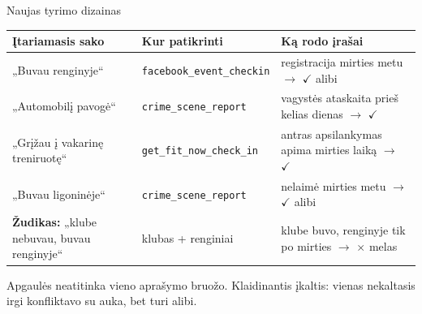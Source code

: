 \documentclass[hyperref={breaklinks=true},fleqn,mathserif]{beamer}
\newcommand{\yes}{\textcolor{green!50!black}{$\checkmark$}}
\newcommand{\no}{\textcolor{red!70!black}{$\times$}}
\begin{document}
\begin{frame}{Naujas tyrimo dizainas}

\begin{center}
\end{center}

\vspace{-2mm}
\scriptsize
\setlength{\tabcolsep}{3pt}
\begin{tabular}{@{}>{\raggedright\arraybackslash}p{}>{\raggedright\arraybackslash}p{}>{\raggedright\arraybackslash}p{}@{}}
\toprule
Įtariamasis sako & Kur patikrinti & Ką rodo įrašai \\
\midrule
„Buvau renginyje“ & \texttt{facebook\_event\_checkin} & registracija mirties metu \(\rightarrow\) \yes{} alibi \\
„Automobilį pavogė“ & \texttt{crime\_scene\_report} & vagystės ataskaita prieš kelias dienas \(\rightarrow\) \yes{} \\
„Grįžau į vakarinę treniruotę“ & \texttt{get\_fit\_now\_check\_in} & antras apsilankymas apima mirties laiką \(\rightarrow\) \yes{} \\
„Buvau ligoninėje“ & \texttt{crime\_scene\_report} & nelaimė mirties metu \(\rightarrow\) \yes{} alibi \\
\midrule
\textbf{Žudikas:} „klube nebuvau, buvau renginyje“ & klubas + renginiai & klube buvo, renginyje tik po mirties \(\rightarrow\) \no{} melas \\
\bottomrule
\end{tabular}
\par\smallskip
\footnotesize Apgaulės neatitinka vieno aprašymo bruožo. Klaidinantis įkaltis: vienas nekaltasis irgi
konfliktavo su auka, bet turi alibi.

\end{frame}
\end{document}
